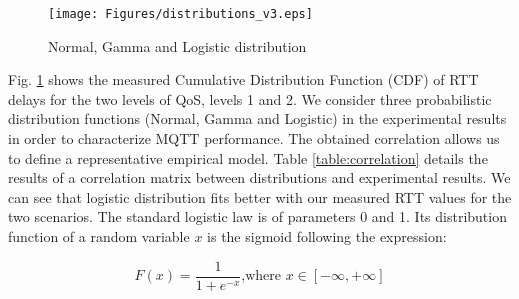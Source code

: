 \begin{figure}[!htb]
\centering
\texttt{[image: Figures/distributions\_v3.eps]}
\caption{Normal, Gamma and Logistic distribution}
\label{fig:cdf_distribution.pdf}
\end{figure}

Fig. \ref{fig:cdf_distribution.pdf} shows the measured Cumulative Distribution Function (CDF) of RTT delays for the two levels of QoS, levels 1 and 2. We consider three probabilistic distribution functions (Normal, Gamma and Logistic) in the experimental results in order to characterize MQTT performance. The obtained correlation allows us to define a representative empirical model. Table \ref{table:correlation} details the results of a correlation matrix between distributions and experimental results. We can see that logistic distribution \cite{STEPHENS1979} fits better with our measured RTT values for the two scenarios. The standard logistic law is of parameters 0 and 1. Its distribution function of a random variable $x$ is the sigmoid following the expression:

\begin{equation}
F(x) = \frac{1}{1 + e^{-x}} \mbox{,where } x\in \left[ -\infty, +\infty\right]
\end{equation}




%


